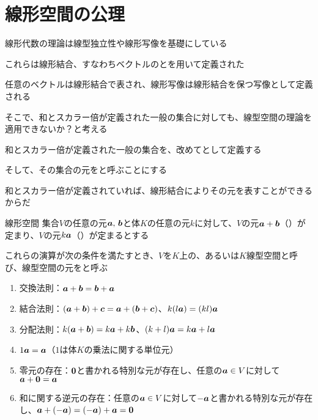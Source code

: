 \documentclass[../../../topic_linear-algebra]{subfiles}
\begin{document}
\sectionline
\section{線形空間の公理}

線形代数の理論は線型独立性や線形写像を基礎にしている

これらは線形結合、すなわちベクトルのとを用いて定義された

任意のベクトルは線形結合で表され、線形写像は線形結合を保つ写像として定義される

\br

そこで、和とスカラー倍が定義された一般の集合に対しても、線型空間の理論を適用できないか？と考える

\br

和とスカラー倍が定義された一般の集合を、改めてとして定義する

そして、その集合の元をと呼ぶことにする

和とスカラー倍が定義されていれば、線形結合によりその元を表すことができるからだ

\begin{definition}{線形空間}
  集合$V$の任意の元$\vb*{a},\,\vb*{b}$と体$K$の任意の元$k$に対して、$V$の元$\vb*{a} + \vb*{b}$（）が定まり、$V$の元$k\vb*{a}$（）が定まるとする

  これらの演算が次の条件を満たすとき、$V$を$K$上の、あるいは$K$線型空間と呼び、線型空間の元をと呼ぶ

  \begin{enumerate}[label=\romanlabel]
    \item 交換法則：$\vb*{a} + \vb*{b} = \vb*{b} + \vb*{a}$
    \item 結合法則：$(\vb*{a} + \vb*{b}) + \vb*{c} = \vb*{a} + (\vb*{b} + \vb*{c})$、$k(l\vb*{a}) = (kl)\vb*{a}$
    \item 分配法則：$k(\vb*{a} + \vb*{b}) = k\vb*{a} + k\vb*{b}$、$(k + l)\vb*{a} = k\vb*{a} + l\vb*{a}$
    \item $1 \vb*{a} = \vb*{a}$（$1$は体$K$の乗法に関する単位元）
    \item 零元の存在：$\vb*{0}$と書かれる特別な元が存在し、任意の$\vb*{a} \in V$に対して$\vb*{a} + \vb*{0} = \vb*{a}$
    \item 和に関する逆元の存在：任意の$\vb*{a} \in V$に対して$-\vb*{a}$と書かれる特別な元が存在し、$\vb*{a} + (-\vb*{a}) = (-\vb*{a}) + \vb*{a} = \vb*{0}$
  \end{enumerate}
\end{definition}
\end{document}
